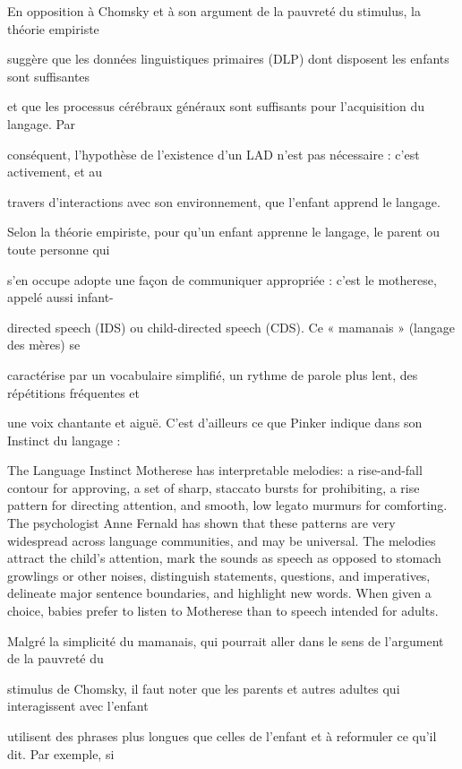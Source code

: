 En opposition à Chomsky et à son argument de la pauvreté du stimulus, la théorie empiriste

suggère que les données linguistiques primaires (DLP) dont disposent les enfants sont suffisantes

et que les processus cérébraux généraux sont suffisants pour l’acquisition du langage. Par

conséquent, l'hypothèse de l'existence d'un LAD n'est pas nécessaire : c’est activement, et au

travers d'interactions avec son environnement, que l'enfant apprend le langage.


Selon la théorie empiriste, pour qu’un enfant apprenne le langage, le parent ou toute personne qui

s'en occupe adopte une façon de communiquer appropriée : c'est le motherese, appelé aussi infant-

directed speech (IDS) ou child-directed speech (CDS). Ce « mamanais » (langage des mères) se

caractérise par un vocabulaire simplifié, un rythme de parole plus lent, des répétitions fréquentes et

une voix chantante et aiguë. C'est d'ailleurs ce que Pinker indique dans son Instinct du langage :
\begin{lecture}{The Language Instinct}
Motherese has interpretable melodies: a rise-and-fall contour for approving, a set of sharp, staccato bursts for prohibiting, a rise pattern for directing attention, and smooth, low legato murmurs for comforting. The psychologist Anne Fernald has shown that these patterns are very widespread across language communities, and may be universal. The melodies attract the child’s attention, mark the sounds as speech as opposed to stomach growlings or other noises, distinguish statements, questions, and imperatives, delineate major sentence boundaries, and highlight new words. When given a choice, babies prefer to listen to Motherese than to speech intended for adults.
\end{lecture}

Malgré la simplicité du mamanais, qui pourrait aller dans le sens de l'argument de la pauvreté du

stimulus de Chomsky, il faut noter que les parents et autres adultes qui interagissent avec l'enfant

utilisent des phrases plus longues que celles de l'enfant et à reformuler ce qu'il dit. Par exemple, si

